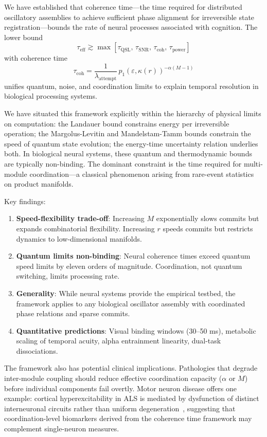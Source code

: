 \documentclass[12pt]{article}
\begin{document}
We have established that coherence time---the time required for distributed oscillatory assemblies to achieve sufficient phase alignment for irreversible state registration---bounds the rate of neural processes associated with cognition. The lower bound
\[
\tau_{\mathrm{eff}} \gtrsim \max\left[\tau_{\mathrm{QSL}},\, \tau_{\mathrm{SNR}},\, \tau_{\mathrm{coh}},\, \tau_{\mathrm{power}}\right]
\]
with coherence time
\[
\tau_{\mathrm{coh}} = \frac{1}{\lambda_{\mathrm{attempt}}}\,p_1(\varepsilon, \kappa(r))^{-\alpha(M-1)}
\]
unifies quantum, noise, and coordination limits to explain temporal resolution in biological processing systems.

We have situated this framework explicitly within the hierarchy of physical limits on computation: the Landauer bound constrains energy per irreversible operation; the Margolus-Levitin and Mandelstam-Tamm bounds constrain the speed of quantum state evolution; the energy-time uncertainty relation underlies both. In biological neural systems, these quantum and thermodynamic bounds are typically non-binding. The dominant constraint is the time required for multi-module coordination---a classical phenomenon arising from rare-event statistics on product manifolds.

Key findings:
\begin{enumerate}
\item \textbf{Speed-flexibility trade-off}: Increasing $M$ exponentially slows commits but expands combinatorial flexibility. Increasing $r$ speeds commits but restricts dynamics to low-dimensional manifolds.

\item \textbf{Quantum limits non-binding}: Neural coherence times exceed quantum speed limits by eleven orders of magnitude. Coordination, not quantum switching, limits processing rate.

\item \textbf{Generality}: While neural systems provide the empirical testbed, the framework applies to any biological oscillator assembly with coordinated phase relations and sparse commits.

\item \textbf{Quantitative predictions}: Visual binding windows (30--50 ms), metabolic scaling of temporal acuity, alpha entrainment linearity, dual-task dissociations.
\end{enumerate}

The framework also has potential clinical implications. Pathologies that degrade inter-module coupling should reduce effective coordination capacity ($\alpha$ or $M$) before individual components fail overtly. Motor neuron disease offers one example: cortical hyperexcitability in ALS is mediated by dysfunction of distinct interneuronal circuits rather than uniform degeneration~\cite{pavey2024}, suggesting that coordination-level biomarkers derived from the coherence time framework may complement single-neuron measures.
\end{document}
